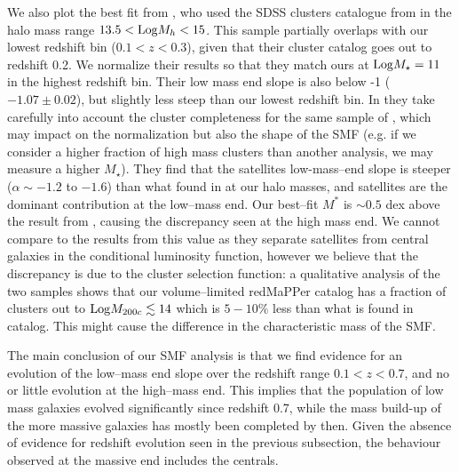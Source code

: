 {We also plot the best fit from \citet{weigel}, who used the SDSS clusters catalogue from \citet{yang07} in the halo mass range $13.5<{\rm Log} M_h<15$. This sample partially overlaps with our lowest redshift bin ($0.1<z<0.3$), given that their cluster catalog goes out to redshift 0.2.  We normalize their results so that they match ours at ${\rm Log} M_\star =11$ in the highest redshift bin. Their low mass end slope is also below -1 ($-1.07\pm0.02$), but slightly less steep than our lowest redshift bin. In \citet{yang} they take carefully into account the cluster completeness for the same sample of \citet{weigel}, which may impact on the normalization but also the shape of the SMF (e.g. if we consider a higher fraction of high mass clusters than another analysis, we may measure a higher $M_\star$). They find that the satellites low-mass--end slope is steeper ($\alpha\sim -1.2$ to $-1.6$) than what found in \citet{weigel} at our halo masses, and satellites are the dominant contribution at the low--mass end. Our best--fit $M^*$ is $\sim 0.5$ dex above the result from \citet{weigel}, causing the discrepancy seen at the high mass end. We cannot compare to the results from \citet{yang} this value as they separate satellites from central galaxies in the conditional luminosity function, however we believe that the discrepancy is due to the cluster selection function: a qualitative analysis of the two samples shows that our volume--limited redMaPPer catalog has a fraction of clusters out to ${\rm Log} M_{200c}\lesssim 14$ which is $5-10\%$ less than what is found in \citet{yang07} catalog. This might cause the difference in the characteristic mass of the SMF.

The main conclusion of our SMF analysis is that we find evidence for an evolution of the low--mass end slope over the redshift range $0.1<z<0.7$, and no or little evolution at the high--mass end. This implies that the population of low mass galaxies evolved significantly since redshift 0.7, while the mass build-up of the more massive galaxies has mostly been completed by then.  Given the absence of evidence for redshift evolution seen in the previous subsection, the behaviour observed at the massive end includes the centrals.



}
